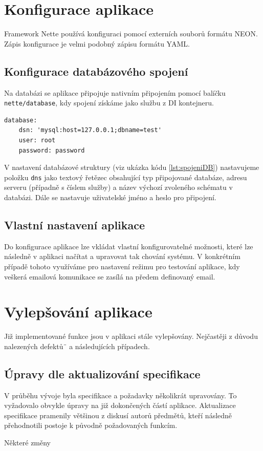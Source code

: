 \documentclass[czech,BP]{thesiskiv}
\begin{document}
	\section{Konfigurace aplikace}
	\par Framework Nette používá konfiguraci pomocí externích souborů formátu NEON. Zápis konfigurace je velmi podobný zápisu formátu YAML.
	\subsection{Konfigurace databázového spojení}
	\par Na databázi se aplikace připojuje nativním připojením pomocí balíčku \texttt{nette/database}, kdy spojení získáme jako službu z DI kontejneru.
	\begin{lstlisting}[caption={Konfigurace databázového spojení},label={lst:spojeniDB}]
database:
	dsn: 'mysql:host=127.0.0.1;dbname=test'
	user: root
	password: password
\end{lstlisting}
	\par V nastavení databázové struktury (viz ukázka kódu \ref{lst:spojeniDB}) nastavujeme položku \texttt{dns} jako textový řetězec obsahující typ připojované databáze, adresu serveru (případně s číslem služby) a název výchozí zvoleného schématu v databázi. Dále se nastavuje uživatelské jméno a heslo pro připojení.
	\subsection{Vlastní nastavení aplikace}
	\par Do konfigurace aplikace lze vkládat vlastní konfigurovatelné možnosti, které lze následně v aplikaci načítat a upravovat tak chování systému. V konkrétním případě tohoto využíváme pro nastavení režimu pro testování aplikace, kdy veškerá emailová komunikace se zasílá na předem definovaný email.
	\section{Vylepšování aplikace}
	\par Již implementované funkce jsou v aplikaci stále vylepšovány. Nejčastěji z důvodu nalezených defektů¨ a následujících případech.
	\subsection{Úpravy dle aktualizování specifikace}
	\par V průběhu vývoje byla specifikace a požadavky několikrát upravovány. To vyžadovalo obvykle úpravy na již dokončených částí aplikace. Aktualizace specifikace pramenily většinou z diskusí autorů předmětů, kteří následně přehodnotili postoje k původně požadovaných funkcím. 
	\par Některé změny 
\end{document}
